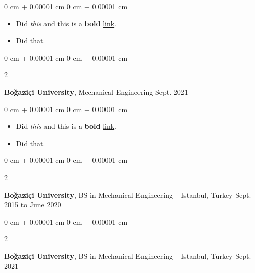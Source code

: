\documentclass[10pt, letterpaper]{article}
\newenvironment{highlights}{
    \begin{itemize}[
        topsep=0.10 cm,
        parsep=0.10 cm,
        partopsep=0pt,
        itemsep=0pt,
        leftmargin=0 cm + 10pt
    ]
}{
    \end{itemize}
        
    \vspace{-0.10cm}
} %
\newenvironment{onecolentry}{
    \begin{adjustwidth}{
        0 cm + 0.00001 cm
    }{
        0 cm + 0.00001 cm
    }
}{
    \end{adjustwidth}
} %
\newenvironment{twocolentry}[2][]{
    \onecolentry
    \def\secondColumn{#2}
    \setcolumnwidth{\fill, 4.1 cm}
    \begin{paracol}{2}
}{
    \switchcolumn \raggedleft \secondColumn
    \end{paracol}
    \endonecolentry
} %
\begin{document}
        \vspace{0.10 cm}
        \begin{onecolentry}
            \begin{highlights}
                \item Did \textit{this} and this is a \textbf{bold} \href{https://example.com}{link}.
                \item Did that.
            \end{highlights}
        \end{onecolentry}


        \vspace{0.15 cm}

        \begin{twocolentry}{
            Sept. 2021
        }
            \textbf{Boğaziçi University}, Mechanical Engineering\end{twocolentry}

        \vspace{0.10 cm}
        \begin{onecolentry}
            \begin{highlights}
                \item Did \textit{this} and this is a \textbf{bold} \href{https://example.com}{link}.
                \item Did that.
            \end{highlights}
        \end{onecolentry}


        \vspace{0.15 cm}

        \begin{twocolentry}{
            Sept. 2015 to June 2020
        }
            \textbf{Boğaziçi University}, BS in Mechanical Engineering -- Istanbul, Turkey\end{twocolentry}

        \vspace{0.10 cm}


        \vspace{0.15 cm}

        \begin{twocolentry}{
            Sept. 2021
        }
            \textbf{Boğaziçi University}, BS in Mechanical Engineering -- Istanbul, Turkey\end{twocolentry}

        \vspace{0.10 cm}


        \vspace{0.15 cm}
\end{document}
